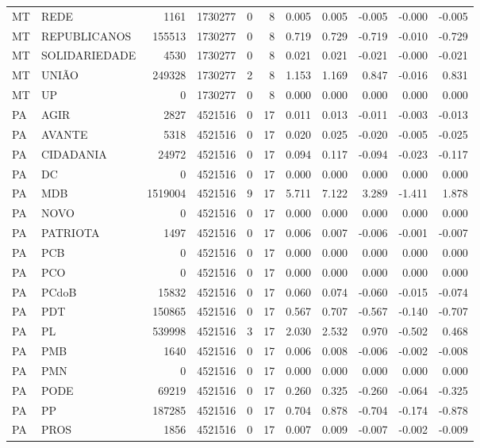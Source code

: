 \begin{landscape}
\begin{longtable}{llrrrrrrrrr}
MT & REDE & 1161 & 1730277 & 0 & 8 & 0.005 & 0.005 & -0.005 & -0.000 & -0.005 \\
MT & REPUBLICANOS & 155513 & 1730277 & 0 & 8 & 0.719 & 0.729 & -0.719 & -0.010 & -0.729 \\
MT & SOLIDARIEDADE & 4530 & 1730277 & 0 & 8 & 0.021 & 0.021 & -0.021 & -0.000 & -0.021 \\
MT & UNIÃO & 249328 & 1730277 & 2 & 8 & 1.153 & 1.169 & 0.847 & -0.016 & 0.831 \\
MT & UP & 0 & 1730277 & 0 & 8 & 0.000 & 0.000 & 0.000 & 0.000 & 0.000 \\
PA & AGIR & 2827 & 4521516 & 0 & 17 & 0.011 & 0.013 & -0.011 & -0.003 & -0.013 \\
PA & AVANTE & 5318 & 4521516 & 0 & 17 & 0.020 & 0.025 & -0.020 & -0.005 & -0.025 \\
PA & CIDADANIA & 24972 & 4521516 & 0 & 17 & 0.094 & 0.117 & -0.094 & -0.023 & -0.117 \\
PA & DC & 0 & 4521516 & 0 & 17 & 0.000 & 0.000 & 0.000 & 0.000 & 0.000 \\
PA & MDB & 1519004 & 4521516 & 9 & 17 & 5.711 & 7.122 & 3.289 & -1.411 & 1.878 \\
PA & NOVO & 0 & 4521516 & 0 & 17 & 0.000 & 0.000 & 0.000 & 0.000 & 0.000 \\
PA & PATRIOTA & 1497 & 4521516 & 0 & 17 & 0.006 & 0.007 & -0.006 & -0.001 & -0.007 \\
PA & PCB & 0 & 4521516 & 0 & 17 & 0.000 & 0.000 & 0.000 & 0.000 & 0.000 \\
PA & PCO & 0 & 4521516 & 0 & 17 & 0.000 & 0.000 & 0.000 & 0.000 & 0.000 \\
PA & PCdoB & 15832 & 4521516 & 0 & 17 & 0.060 & 0.074 & -0.060 & -0.015 & -0.074 \\
PA & PDT & 150865 & 4521516 & 0 & 17 & 0.567 & 0.707 & -0.567 & -0.140 & -0.707 \\
PA & PL & 539998 & 4521516 & 3 & 17 & 2.030 & 2.532 & 0.970 & -0.502 & 0.468 \\
PA & PMB & 1640 & 4521516 & 0 & 17 & 0.006 & 0.008 & -0.006 & -0.002 & -0.008 \\
PA & PMN & 0 & 4521516 & 0 & 17 & 0.000 & 0.000 & 0.000 & 0.000 & 0.000 \\
PA & PODE & 69219 & 4521516 & 0 & 17 & 0.260 & 0.325 & -0.260 & -0.064 & -0.325 \\
PA & PP & 187285 & 4521516 & 0 & 17 & 0.704 & 0.878 & -0.704 & -0.174 & -0.878 \\
PA & PROS & 1856 & 4521516 & 0 & 17 & 0.007 & 0.009 & -0.007 & -0.002 & -0.009 \\

\end{longtable}
\end{landscape}
